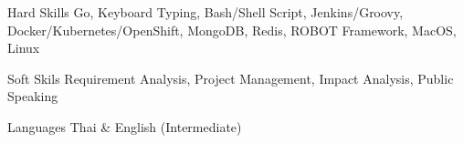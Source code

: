
\begin{cvskills}

  \cvskill
    {Hard Skills}
    {Go, Keyboard Typing, Bash/Shell Script, Jenkins/Groovy, Docker/Kubernetes/OpenShift, MongoDB, Redis, ROBOT Framework, MacOS, Linux}

    \cvskill
    {Soft Skils}
    {Requirement Analysis, Project Management, Impact Analysis, Public Speaking}

  \cvskill
    {Languages}
    {Thai \& English (Intermediate)}

\end{cvskills}
